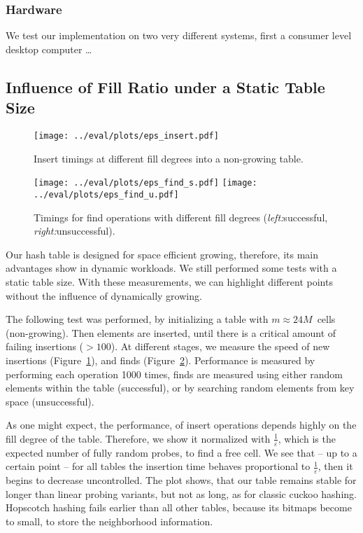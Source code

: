 \documentclass[a4paper,UKenglish]{lipics-v2016}
\begin{document}
\subsubsection*{Hardware}
We test our implementation on two very different systems, first a
consumer level desktop computer \ldots{}

\subsection{Influence of Fill Ratio under a Static Table Size}
\label{sec:exp_eps}
\begin{figure}[ht]
  \centering
  \texttt{[image: ../eval/plots/eps\_insert.pdf]}
  \caption{\label{fig:eps_insert}Insert timings at different fill
    degrees into a non-growing table.}
\end{figure}
\begin{figure}[ht]
  \centering
  \texttt{[image: ../eval/plots/eps\_find\_s.pdf]}
  \texttt{[image: ../eval/plots/eps\_find\_u.pdf]}
  \caption{Timings for find operations with different fill degrees
    (\emph{left:}successful, \emph{right:}unsuccessful).}
  \label{fig:eps_find}
\end{figure}
Our hash table is designed for space efficient growing, therefore, its
main advantages show in dynamic workloads.  We still performed some
tests with a static table size.  With these measurements, we can
highlight different points without the influence of dynamically growing.

The following test was performed, by initializing a table with
$m\approx24M$~cells (non-growing). Then elements are inserted, until there
is a critical amount of failing insertions ($>100$).  At different
stages, we measure the speed of new insertions
(Figure~\ref{fig:eps_insert}), and finds (Figure~\ref{fig:eps_find}).
Performance is measured by performing each operation 1000 times, finds
are measured using either random elements within the table (successful), or by
searching random elements from key space (unsuccessful).

As one might expect, the performance, of insert operations depends
highly on the fill degree of the table.  Therefore, we show it
normalized with $\frac{1}{\varepsilon}$, which is the expected number
of fully random probes, to find a free cell. We see that -- up to a
certain point -- for all tables the insertion time behaves
proportional to $\frac{1}{\varepsilon}$, then it begins to decrease
uncontrolled.  The plot shows, that our table remains stable for
longer than linear probing variants, but not as long, as for classic
cuckoo hashing.  Hopscotch hashing fails earlier than all other
tables, because its bitmaps become to small, to store the neighborhood
information.
\end{document}
